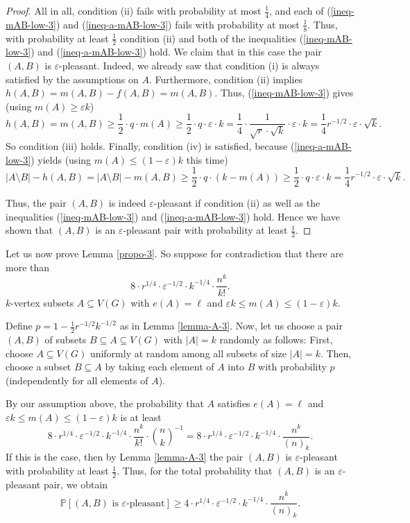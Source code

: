 \documentclass[11pt]{article}
\theoremstyle{definition}
\numberwithin{equation}{section}
\begin{document}
\begin{proof}
All in all, condition (ii) fails with probability at most $\frac{1}{4}$, and each of (\ref{ineq-mAB-low-3}) and (\ref{ineq-a-mAB-low-3}) fails with probability at most $\frac{1}{8}$. Thus, with probability at least $\frac{1}{2}$ condition (ii) and both of the inequalities (\ref{ineq-mAB-low-3}) and (\ref{ineq-a-mAB-low-3}) hold. We claim that in this case the pair $(A,B)$ is $\varepsilon$-pleasant. Indeed, we already saw that condition (i) is always satisfied by the assumptions on $A$. Furthermore, condition (ii) implies $h(A,B)=m(A,B)-f(A,B)=m(A,B)$. Thus, (\ref{ineq-mAB-low-3}) gives (using $m(A)\geq \varepsilon k$)
\[h(A,B)=m(A,B)\geq \frac{1}{2}\cdot q \cdot m(A)\geq \frac{1}{2}\cdot q\cdot \varepsilon\cdot k=\frac{1}{4}\cdot \frac{1}{\sqrt{r}\cdot \sqrt{k}}\cdot \varepsilon\cdot k=\frac{1}{4}r^{-1/2}\cdot \varepsilon\cdot \sqrt{k}.\]
So condition (iii) holds. Finally, condition (iv) is satisfied, because (\ref{ineq-a-mAB-low-3}) yields (using $m(A)\leq (1-\varepsilon) k$ this time)
\[\vert A\setminus B\vert- h(A,B)=\vert A\setminus B\vert - m(A,B)\geq \frac{1}{2}\cdot q \cdot (k-m(A))\geq \frac{1}{2}\cdot q\cdot \varepsilon\cdot k=\frac{1}{4}r^{-1/2}\cdot \varepsilon\cdot \sqrt{k}.\]

Thus, the pair $(A,B)$ is indeed $\varepsilon$-pleasant if condition (ii) as well as the inequalities (\ref{ineq-mAB-low-3}) and (\ref{ineq-a-mAB-low-3}) hold. Hence we have shown that $(A,B)$ is an $\varepsilon$-pleasant pair with probability at least $\frac{1}{2}$.
\end{proof}

Let us now prove Lemma \ref{propo-3}. So suppose for contradiction that there are more than
\[8\cdot r^{1/4}\cdot \varepsilon^{-1/2}\cdot k^{-1/4}\cdot \frac{n^k}{k!}.\]
$k$-vertex subsets $A\subseteq V(G)$ with $e(A)=\ell$ and $\varepsilon k \leq m(A)\leq (1-\varepsilon) k$. 

Define $p=1-\frac{1}{2}r^{-1/2}k^{-1/2}$ as in Lemma \ref{lemma-A-3}. Now, let us choose a pair $(A,B)$ of subsets $B\subseteq A\subseteq V(G)$ with $\vert A\vert=k$ randomly as follows: First, choose $A\subseteq V(G)$ uniformly at random among all subsets of size $\vert A\vert=k$. Then, choose a subset $B\subseteq A$ by taking each element of $A$ into $B$ with probability $p$ (independently for all elements of $A$).

By our assumption above, the probability that $A$ satisfies $e(A)=\ell$ and $\varepsilon k \leq m(A)\leq (1-\varepsilon) k$ is at least
\[8\cdot r^{1/4}\cdot \varepsilon^{-1/2}\cdot k^{-1/4}\cdot \frac{n^k}{k!}\cdot {n\choose k}^{-1}=8\cdot r^{1/4}\cdot \varepsilon^{-1/2}\cdot k^{-1/4}\cdot \frac{n^k}{(n)_k}.\]
If this is the case, then by Lemma \ref{lemma-A-3} the pair $(A,B)$ is $\varepsilon$-pleasant with probability at least $\frac{1}{2}$. Thus, for the total probability that $(A,B)$ is an $\varepsilon$-pleasant pair, we obtain
\begin{equation}\label{ineq-ABpleasantup3}
\mathbb{P}[(A,B)\text{ is }\varepsilon\text{-pleasant}]\geq 
4\cdot r^{1/4}\cdot \varepsilon^{-1/2}\cdot k^{-1/4}\cdot\frac{n^k}{(n)_k}.
\end{equation}
\end{document}
